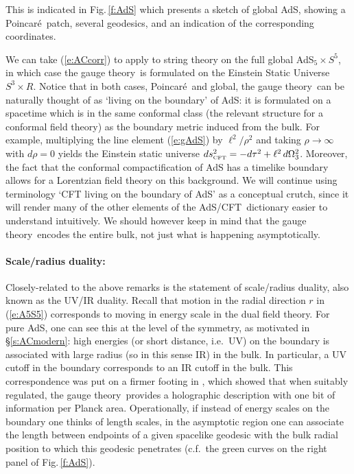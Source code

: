 \documentclass[12pt]{article}
\def\sect#1{\S\ref{#1}}
\def\fig#1{Fig.\,\ref{#1}}
\def\req#1{(\ref{#1})}
\def\AC{AdS/CFT}
\def\GT{gauge theory}
\def\Poinc{Poincar\' e}
\def\adss#1#2{AdS$_{#1} \times S^{#2}$}
\def\Rads{\ell}
\begin{document}
%
This is indicated in \fig{f:AdS} which presents a sketch of global AdS, showing a \Poinc\ patch, several geodesics, and an indication of the corresponding coordinates.

We can take \req{e:ACcorr} to apply to string theory on the full global \adss55, in which case the \GT\ is formulated on the Einstein Static Universe $S^3 \times R$.
Notice that in both cases, \Poinc\ and global, the \GT\ can be naturally thought of as `living on the boundary' of AdS:  it is formulated on a spacetime which is in the same conformal class (the relevant structure for a conformal field theory) as the boundary metric induced from the bulk.  For example, multiplying the line element \req{e:gAdS} by $\Rads^2 / \rho^2$ and taking $\rho \to \infty$ with $d\rho = 0$ yields the Einstein static universe $ds_{\scriptscriptstyle {\rm CFT}}^2 = - d\tau^2 + \Rads^2 \, d\Omega_3^2$.
Moreover, the fact that the conformal compactification of AdS has a timelike boundary allows for a Lorentzian field theory on this background.
We will continue using  terminology  `CFT living on the boundary of AdS' as a conceptual crutch, since it will render many of the other elements of the \AC\ dictionary easier to understand intuitively.  We should however keep in mind that the \GT\ encodes the entire bulk, not just what is happening asymptotically.


\paragraph{Scale/radius duality:}  %
Closely-related to the above remarks is the statement of scale/radius duality, also known as the UV/IR duality.  
Recall that motion in the radial direction $r$  in \req{e:A5S5} corresponds to moving in energy scale in the dual field theory.  For pure AdS, one can see this at the level of the symmetry, as motivated in \sect{s:ACmodern}: high energies (or short distance, i.e.\ UV) on the boundary is associated with large radius (so in this sense IR) in the bulk. In particular, a UV cutoff in the boundary corresponds to an IR cutoff in the bulk.  
This correspondence was put on a firmer footing in \cite{Susskind:1998dq}, which showed that when suitably regulated, the \GT\ provides a  holographic description with one bit of information per Planck area.
Operationally, if instead of energy scales on the boundary one thinks of length scales, in the asymptotic region one can associate the length between endpoints of a given spacelike geodesic with the bulk radial position to which this geodesic penetrates (c.f.\ the green curves on the right panel of \fig{f:AdS}).
\end{document}
